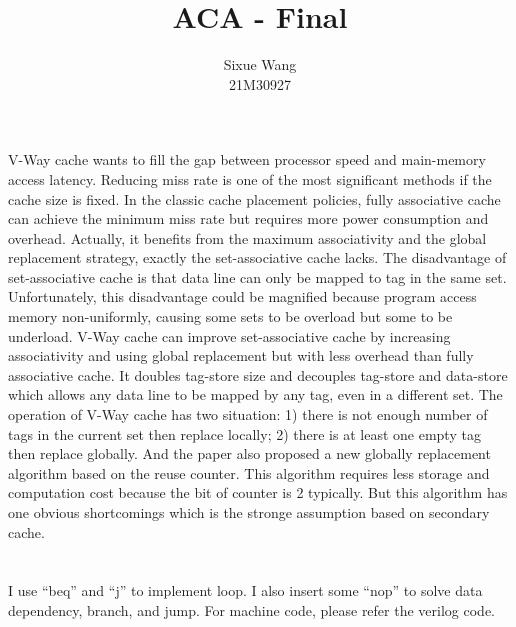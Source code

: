 \documentclass{article}
\title{ACA - Final}
\author{Sixue Wang \\ 21M30927}
\begin{document}
\maketitle

\section{}
V-Way cache wants to fill the gap between processor speed and main-memory access latency.
Reducing miss rate is one of the most significant methods if the cache size is fixed.
In the classic cache placement policies, fully associative cache can achieve the minimum miss rate but requires more power consumption and overhead.
Actually, it benefits from the maximum associativity and the global replacement strategy, exactly the set-associative cache lacks.
The disadvantage of set-associative cache is that data line can only be mapped to tag in the same set.
Unfortunately, this disadvantage could be magnified because program access memory non-uniformly, causing some sets to be overload but some to be underload.
V-Way cache can improve set-associative cache by increasing associativity and using global replacement but with less overhead than fully associative cache.
It doubles tag-store size and decouples tag-store and data-store which allows any data line to be mapped by any tag, even in a different set.
The operation of V-Way cache has two situation:
1) there is not enough number of tags in the current set then replace locally;
2) there is at least one empty tag then replace globally.
And the paper also proposed a new globally replacement algorithm based on the reuse counter. This algorithm requires less storage and computation cost because the bit of counter is 2 typically. But this algorithm has one obvious shortcomings which is the stronge assumption based on secondary cache.

\section{}
I use ``beq'' and ``j'' to implement loop. I also insert some ``nop'' to solve data dependency, branch, and jump. For machine code, please refer the verilog code.
\subsection{}

\subsection{}

\end{document}
